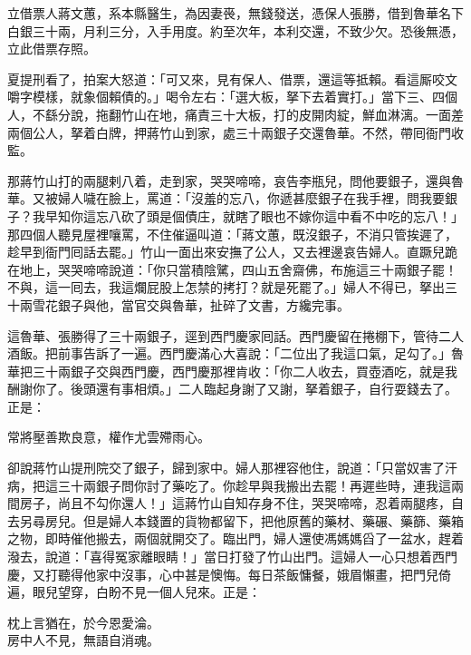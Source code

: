 \begin{myquote}[\markfont]
立借票人蔣文蕙，系本縣醫生，為因妻䘮，無錢發送，憑保人張勝，借到魯華名下白銀三十兩，月利三分，入手用度。約至次年，本利交還，不致少欠。恐後無憑，立此借票存照。
\end{myquote}

夏提刑看了，拍案大怒道：「可又來，見有保人、借票，還這等抵賴。看這厮咬文嚼字模樣，就象個賴債的。」{}喝令左右：「選大板，拏下去着實打。」當下三、四個人，不繇分說，拖翻竹山在地，痛責三十大板，打的皮開肉綻，鮮血淋漓。一面差兩個公人，拏着白牌，押蔣竹山到家，處三十兩銀子交還魯華。不然，帶囘衙門收監。

那蔣竹山打的兩腿剌八着，走到家，哭哭啼啼，哀告李瓶兒，問他要銀子，還與魯華。又被婦人噦在臉上，罵道：「沒羞的忘八，你遞甚麼銀子在我手裡，問我要銀子？我早知你這忘八砍了頭是個債庄，就瞎了眼也不嫁你這中看不中吃的忘八！」那四個人聽見屋裡嚷罵，不住催逼叫道：「蔣文蕙，既沒銀子，不消只管挨遲了，趁早到衙門囘話去罷。」竹山一面出來安撫了公人，又去裡邊哀告婦人。直蹶兒跪在地上，{}哭哭啼啼說道：「你只當積陰騭，四山五舍齋佛，布施這三十兩銀子罷！不與，這一囘去，我這爛屁股上怎禁的拷打？就是死罷了。」婦人不得已，拏出三十兩雪花銀子與他，{}當官交與魯華，扯碎了文書，方纔完事。

這魯華、張勝得了三十兩銀子，逕到西門慶家囘話。西門慶留在捲棚下，管待二人酒飯。把前事告訴了一遍。西門慶滿心大喜說：「二位出了我這口氣，足勾了。」魯華把三十兩銀子交與西門慶，西門慶那裡肯收：「你二人收去，買壺酒吃，就是我酬謝你了。後頭還有事相煩。」二人臨起身謝了又謝，拏着銀子，自行耍錢去了。正是：

\begin{myquote} 
常將壓善欺良意，權作尤雲殢雨心。
\end{myquote} 

卻說蔣竹山提刑院交了銀子，歸到家中。婦人那裡容他住，說道：「只當奴害了汗病，把這三十兩銀子問你討了藥吃了。你趁早與我搬出去罷！再遲些時，連我這兩間房子，尚且不勾你還人！」這蔣竹山自知存身不住，{}哭哭啼啼，忍着兩腿疼，自去另尋房兒。但是婦人本錢置的貨物都留下，{}把他原舊的藥材、藥碾、藥篩、藥箱之物，即時催他搬去，兩個就開交了。臨出門，婦人還使馮媽媽舀了一盆水，趕着潑去，說道：「喜得冤家離眼睛！」當日打發了竹山出門。這婦人一心只想着西門慶，又打聽得他家中沒事，心中甚是懊悔。{}每日茶飯慵餐，娥眉懶畫，把門兒倚遍，眼兒望穿，白盼不見一個人兒來。正是：

\begin{myquote} 
枕上言猶在，於今恩愛淪。\\房中人不見，無語自消魂。
\end{myquote} 

